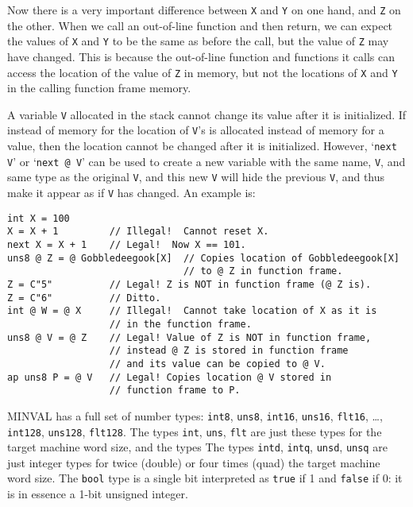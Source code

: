 \documentclass[12pt]{article}
\newenvironment{indpar}[1][0.3in]%
	{\begin{list}{}%
		     {\setlength{\itemsep}{0in}%
		      \setlength{\topsep}{0in}%
		      \setlength{\parsep}{1ex}%
		      \setlength{\labelwidth}{#1}%
		      \setlength{\leftmargin}{#1}%
		      \addtolength{\leftmargin}{\labelsep}}%
	 \item}%
	{\end{list}}
\begin{document}
Now there is a very important difference between {\tt X} and {\tt Y} on one
hand, and {\tt Z} on the other.  When we call an
out-of-line function and then return, we can expect the values of
{\tt X} and {\tt Y} to be the same as before the call, but the value of
{\tt Z} may have changed.  This is because the out-of-line
function and functions it calls can access the location of the value of
{\tt Z} in memory, but not the locations of {\tt X} and {\tt Y}
in the calling function frame memory.

A variable {\tt V} allocated in the stack cannot change its value after
it is initialized.  If instead of memory for the location of
{\tt V}'s is allocated instead of memory for a value, then the location
cannot be changed after it is initialized.  However, `{\tt next V}'
or `{\tt next @ V}' can be used to create a new variable with the same
name, {\tt V}, and same type as the original {\tt V}, and this new
{\tt V} will hide the previous {\tt V}, and thus make it appear as
if {\tt V} has changed.  An example is:
\begin{indpar}\begin{verbatim}
int X = 100
X = X + 1         // Illegal!  Cannot reset X.
next X = X + 1    // Legal!  Now X == 101.
uns8 @ Z = @ Gobbledeegook[X]  // Copies location of Gobbledeegook[X]
                               // to @ Z in function frame.
Z = C"5"          // Legal! Z is NOT in function frame (@ Z is).
Z = C"6"          // Ditto.
int @ W = @ X     // Illegal!  Cannot take location of X as it is
                  // in the function frame.
uns8 @ V = @ Z    // Legal! Value of Z is NOT in function frame,
                  // instead @ Z is stored in function frame
                  // and its value can be copied to @ V.
ap uns8 P = @ V   // Legal! Copies location @ V stored in
                  // function frame to P.
\end{verbatim}\end{indpar}

MINVAL has a full set of number types:
{\tt int8}, {\tt uns8},
{\tt int16}, {\tt uns16}, {\tt flt16}, \ldots,
{\tt int128}, {\tt uns128}, {\tt flt128}.
The types {\tt int}, {\tt uns}, {\tt flt} are just these
types for the target machine word size, and the types
The types {\tt intd}, {\tt intq}, {\tt unsd}, {\tt unsq} are just integer
types for twice (double) or four times (quad) the target machine word size.
The {\tt bool} type is a single bit interpreted as {\tt true} if
1 and {\tt false} if 0: it is in essence a 1-bit unsigned integer.
\end{document}
